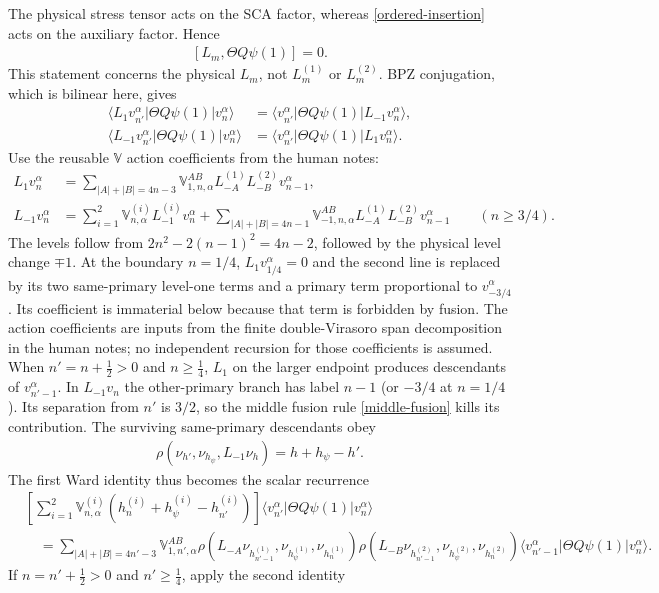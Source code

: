 \documentclass[12pt]{article}
\newcommand{\ie}{\begin{equation}\begin{aligned}}
\newcommand{\fe}{\end{aligned}\end{equation}}
\numberwithin{equation}{section}
\begin{document}
The physical stress tensor acts on the SCA factor, whereas
\eqref{ordered-insertion} acts on the auxiliary factor.  Hence
\ie
 {}[L_m,\Theta Q\psi(1)]=0.
\fe
This statement concerns the physical $L_m$, not $L_m^{(1)}$ or
$L_m^{(2)}$.  BPZ conjugation, which is bilinear here, gives
\ie
 \langle L_1v_{n'}^\alpha|\Theta Q\psi(1)|v_n^\alpha\rangle
 &=\langle v_{n'}^\alpha|\Theta Q\psi(1)|L_{-1}v_n^\alpha\rangle,\\
 \langle L_{-1}v_{n'}^\alpha|\Theta Q\psi(1)|v_n^\alpha\rangle
 &=\langle v_{n'}^\alpha|\Theta Q\psi(1)|L_1v_n^\alpha\rangle.
 \label{middle-ward}
\fe
Use the reusable $\mathbb V$ action coefficients from the human notes:
\ie
 L_1v_n^\alpha&=\sum_{|A|+|B|=4n-3}\mathbb V_{1,n,\alpha}^{AB}
 L_{-A}^{(1)}L_{-B}^{(2)}v_{n-1}^\alpha,\\
 L_{-1}v_n^\alpha&=\sum_{i=1}^2\mathbb V_{n,\alpha}^{(i)}
 L_{-1}^{(i)}v_n^\alpha+
 \sum_{|A|+|B|=4n-1}\mathbb V_{-1,n,\alpha}^{AB}
 L_{-A}^{(1)}L_{-B}^{(2)}v_{n-1}^\alpha
 \qquad(n\geq3/4).
\fe
The levels follow from
$2n^2-2(n-1)^2=4n-2$, followed by the physical level change $\mp1$.
At the boundary $n=1/4$, $L_1v_{1/4}^\alpha=0$ and the second line is
replaced by its two same-primary level-one terms and a primary term
proportional to $v_{-3/4}^\alpha$.  Its coefficient is immaterial below
because that term is forbidden by fusion.  The action coefficients are
inputs from the finite double-Virasoro span decomposition in the human
notes; no independent recursion for those coefficients is assumed.
When $n'=n+\frac12>0$ and $n\geq\frac14$, $L_1$ on the larger
endpoint produces descendants of $v_{n'-1}^\alpha$.  In $L_{-1}v_n$
the other-primary branch has label $n-1$ (or $-3/4$ at $n=1/4$).
Its separation from $n'$ is $3/2$, so the middle fusion rule
\eqref{middle-fusion} kills its contribution.  The surviving same-primary
descendants obey
\ie
 \rho(\nu_{h'},\nu_{h_\psi},L_{-1}\nu_h)=h+h_\psi-h'.
\fe
The first Ward identity thus becomes the scalar recurrence
\begin{align}
 &\left[\sum_{i=1}^2\mathbb V_{n,\alpha}^{(i)}
 (h_n^{(i)}+h_\psi^{(i)}-h_{n'}^{(i)})\right]
 \langle v_{n'}^\alpha|\Theta Q\psi(1)|v_n^\alpha\rangle
 \nonumber\\
 &\quad=\sum_{|A|+|B|=4n'-3}\mathbb V_{1,n',\alpha}^{AB}
 \rho(L_{-A}\nu_{h_{n'-1}^{(1)}},\nu_{h_\psi^{(1)}},\nu_{h_n^{(1)}})
 \rho(L_{-B}\nu_{h_{n'-1}^{(2)}},\nu_{h_\psi^{(2)}},\nu_{h_n^{(2)}})
 \langle v_{n'-1}^\alpha|\Theta Q\psi(1)|v_n^\alpha\rangle.
 \label{middle-recurrence-out}
\end{align}
If $n=n'+\frac12>0$ and $n'\geq\frac14$, apply the second identity
\end{document}
